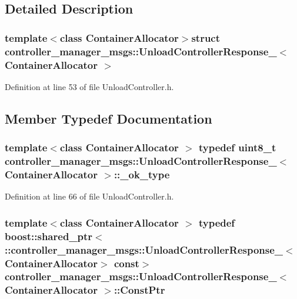 \subsection{\-Detailed \-Description}
\subsubsection*{template$<$class Container\-Allocator$>$struct controller\-\_\-manager\-\_\-msgs\-::\-Unload\-Controller\-Response\-\_\-$<$ Container\-Allocator $>$}



\-Definition at line 53 of file \-Unload\-Controller.\-h.



\subsection{\-Member \-Typedef \-Documentation}
\subsubsection[{\-\_\-ok\-\_\-type}]{\setlength{\rightskip}{0pt plus 5cm}template$<$class Container\-Allocator $>$ typedef uint8\-\_\-t {\bf controller\-\_\-manager\-\_\-msgs\-::\-Unload\-Controller\-Response\-\_\-}$<$ \-Container\-Allocator $>$\-::{\bf \-\_\-ok\-\_\-type}}\label{structcontroller__manager__msgs_1_1UnloadControllerResponse___a500488dde97bd8b3be5b11d3395685e9}


\-Definition at line 66 of file \-Unload\-Controller.\-h.

\subsubsection[{\-Const\-Ptr}]{\setlength{\rightskip}{0pt plus 5cm}template$<$class Container\-Allocator $>$ typedef boost\-::shared\-\_\-ptr$<$ \-::{\bf controller\-\_\-manager\-\_\-msgs\-::\-Unload\-Controller\-Response\-\_\-}$<$\-Container\-Allocator$>$ const$>$ {\bf controller\-\_\-manager\-\_\-msgs\-::\-Unload\-Controller\-Response\-\_\-}$<$ \-Container\-Allocator $>$\-::{\bf \-Const\-Ptr}}\label{structcontroller__manager__msgs_1_1UnloadControllerResponse___a2b42da191652f3d6a78cde4a572d6811}


